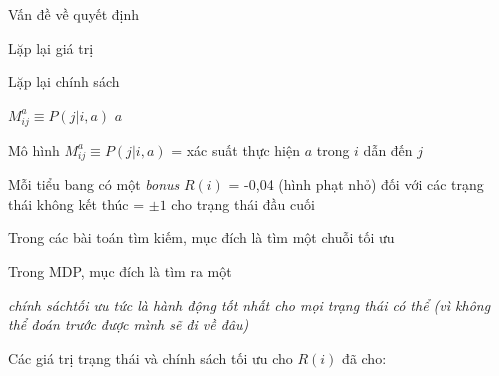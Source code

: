 \documentclass[fleqn]{article}
\begin{document}
\begin{huge}


\blob Vấn đề về quyết định

\blob Lặp lại giá trị

\blob Lặp lại chính sách



\vspace*{0.3in}

\textwidth
{}





\centerline{%
\textwidth
{} \hspace*{1in} $M_{ij}^a \equiv P(j|i,a)$
\textwidth
$a$}

Mô hình $M_{ij}^a \equiv P(j|i,a)$ = xác suất thực hiện $a$ trong $i$ dẫn đến $j$



Mỗi tiểu bang có một {\em bonus} $R(i)$\nl
   = -0,04 (hình phạt nhỏ) đối với các trạng thái không kết thúc\nl
   = $\pm 1$ cho trạng thái đầu cuối



Trong các bài toán tìm kiếm, mục đích là tìm một chuỗi {\em} tối ưu

Trong MDP, mục đích là tìm ra một {\em chính sách\nl tối ưu
   tức là hành động tốt nhất cho mọi trạng thái có thể\nl
   (vì không thể đoán trước được mình sẽ đi về đâu)

Các giá trị trạng thái và chính sách tối ưu cho $R(i)$ đã cho:

\vspace*{0.2in}

%
{}


}
\end{huge}
\end{document}
